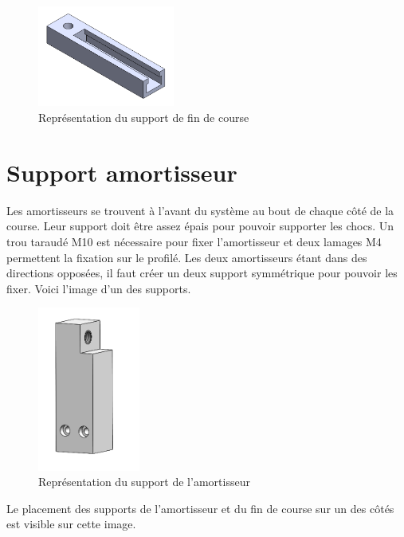 \begin{figure}[H]
    \centering
    \includegraphics[width = 0.4\textwidth]{assets/figures/SupportFinCourse.png}
    \caption{Représentation du support de fin de course}
    \label{fig:SupFinCourse}
\end{figure}

\section{Support amortisseur}\label{sec:SupAmort}
Les amortisseurs se trouvent à l'avant du système au bout de chaque côté de la course. Leur support doit être assez épais pour pouvoir supporter
les chocs. Un trou taraudé M10 est nécessaire pour fixer l'amortisseur et deux lamages M4 permettent la fixation sur le profilé. Les deux amortisseurs
étant dans des directions opposées, il faut créer un deux support symmétrique pour pouvoir les fixer. Voici l'image d'un des supports.

\begin{figure}[H]
    \centering
    \includegraphics[width = 0.3\textwidth]{assets/figures/SupportAmortisseur.png}
    \caption{Représentation du support de l'amortisseur}
    \label{fig:SupAmort}
\end{figure}

Le placement des supports de l'amortisseur et du fin de course sur un des côtés est visible sur cette image.

